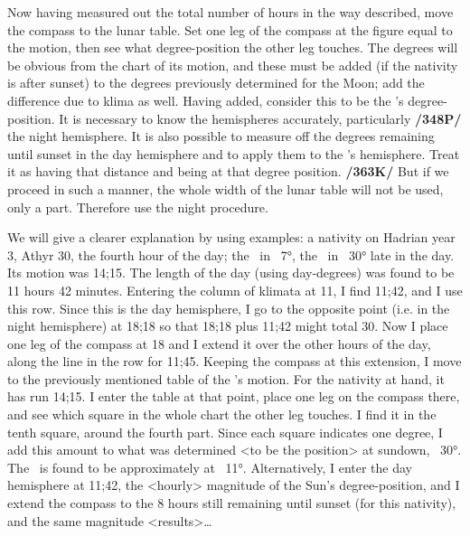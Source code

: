 Now having measured out the total number of hours in the way described, move the compass to the lunar table. Set one leg of the compass at the figure equal to the motion, then see what degree-position the other leg touches. The degrees will be obvious from the chart of its motion, and these must be added (if the nativity is after sunset) to the degrees previously determined for the Moon; add the difference due to klima as well. Having added, consider this to be the \Moon’s degree-position. It is necessary to know the hemispheres accurately, particularly \textbf{/348P/} the night hemisphere. It is also possible to measure off the degrees remaining until sunset in the day hemisphere and to apply them to the \Moon’s hemisphere. Treat it as having that distance and being at that degree position. \textbf{/363K/} But if we proceed in such a manner, the whole width of the lunar table will not be used, only a part. Therefore use the night procedure.

We will give a clearer explanation by using examples: a nativity on Hadrian year 3, Athyr 30, the fourth hour of the day; the \Sun\, in \Scorpio\, 7°, the \Moon\, in \Virgo\, 30° late in the day. Its motion was 14;15. The length of the day (using day-degrees) was found to be 11 hours 42 minutes. Entering the column of klimata at 11, I find 11;42, and I use this row. Since this is the day hemisphere, I go to the opposite point (i.e. in the night hemisphere) at 18;18 so that 18;18 plus 11;42 might total 30. Now I place one leg of the compass at 18 and I extend it over the other hours of the day, along the line in the row for 11;45. Keeping the compass at this extension, I move to the previously mentioned table of the \Moon’s motion. For the nativity at hand, it has run 14;15. I enter the table at that point, place one leg on the compass there, and see which square in the whole chart the other leg touches. I find it in the tenth square, around the fourth part. Since each square indicates one degree, I add this amount to what was determined <to be the position> at sundown, \Virgo\, 30°. The \Moon\, is found to be approximately at \Libra\, 11°. Alternatively, I enter the day hemisphere at 11;42, the <hourly> magnitude of the Sun’s degree-position, and I extend the compass to the 8 hours still remaining until sunset (for this nativity), and the same magnitude <results>…

\newpage

